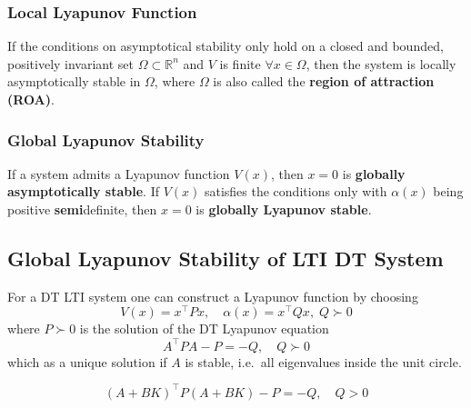 \subsubsection{Local Lyapunov Function}
If the conditions on asymptotical stability only hold on a closed and bounded, positively invariant set $\Omega \subset \mathbb{R}^n$ and $V$ is finite $\forall x \in \Omega$, then the system is locally asymptotically stable in $\Omega$, where $\Omega$ is also called the \textbf{region of attraction (ROA)}.

\subsubsection{Global Lyapunov Stability}
If a system admits a Lyapunov function $V(x)$, then $x=0$ is \textbf{globally asymptotically stable}.
\newpar{}
If $V(x)$ satisfies the conditions only with $\alpha(x)$ being positive \textbf{semi}definite, then $x=0$ is \textbf{globally Lyapunov stable}.

\subsection{Global Lyapunov Stability of LTI DT System}
For a DT LTI system one can construct a Lyapunov function by choosing
\begin{equation*}
    V(x) = x^\top Px,\quad \alpha(x) = x^\top Q x, \;Q \succ 0
\end{equation*}
where $P\succ0$ is the solution of the DT Lyapunov equation
\begin{equation*}
    A^\top PA -P = -Q, \quad Q \succ 0
\end{equation*}
which as a unique solution if $A$ is stable, i.e.\ all eigenvalues inside the unit circle.

\newpar{}
\begin{equation*}
    {(A+BK)}^\top P{(A+BK)} -P = -Q, \quad Q>0
\end{equation*}